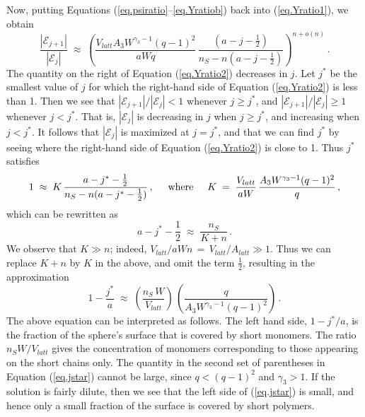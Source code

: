 \documentclass[journal=jacsat,manuscript=article]{achemso}
\begin{document}
Now, putting Equations (\ref{eq.psiratio}--\ref{eq.Yratiob}) back into (\ref{eq.Yratio1}), we obtain
\begin{equation}
    \label{eq.Yratio2}
       \frac{|\mathcal{E}_{j+1}|}{|\mathcal{E}_j|} \; \approx \; 
       \left(  \frac{ V_{latt}A_3W^{\gamma_3-1}(q-1)^2}{aWq} \,
          \frac{(a-j-\frac{1}{2})}{n_S-n(a-j-\frac{1}{2})} \right)^{n+o(n)}   \,.
\end{equation}
The quantity on the right of Equation (\ref{eq.Yratio2}) decreases in $j$.  Let $j^*$ be the 
smallest value of $j$ for which the right-hand side of Equation (\ref{eq.Yratio2}) is less than 1.
Then we see that $|\mathcal{E}_{j+1}|/|\mathcal{E}_j|<1$ whenever $j\geq j^*$, and 
$|\mathcal{E}_{j+1}|/|\mathcal{E}_j|\geq 1$ whenever $j< j^*$.
That is, $|\mathcal{E}_j|$ is decreasing in $j$ when $j\geq j^*$, and 
increasing when $j< j^*$.
It follows that $|\mathcal{E}_j|$ is maximized at $j=j^*$, and that we can find $j^*$ by seeing 
where the right-hand side of Equation (\ref{eq.Yratio2}) is close to 1.   Thus $j^*$ satisfies
\[     1  \;\approx \; 
     K  \,%
          \frac{a-j^*-\frac{1}{2}}{n_S-n(a-j^*-\frac{1}{2})}    \,,  
             \hspace{5mm}\hbox{where}\hspace{5mm}
             K \;=\;   \frac{ V_{latt} }{aW}\, \frac{   A_3W^{\gamma_3-1}(q-1)^2}{q} \,,
\]
which can be rewritten as 
\[       a-j^*-\frac{1}{2} \; \approx\;    \frac{n_S}{K+n}   \,.
\]
We observe that $K\gg n$; indeed,  $V_{latt}/aWn \,=\,V_{latt}/A_{latt}\gg 1$.  
Thus we can replace $K+n$ by $K$ in the above, and omit the term $\frac{1}{2}$, resulting in the   
approximation 
\begin{equation}
    \label{eq.jstar}
     1-\frac{j^*}{a}     \; \approx   \; 
        \left(  \frac{n_S\,W}{V_{latt} }\right) \,\left(   \frac{q}{A_3W^{\gamma_3-1}(q-1)^2}\right)  \,.
\end{equation}
The above equation can be interpreted as follows.  The left hand side, $1-j^*/a$, is the fraction of the
sphere's surface that is covered by short monomers.  The ratio $n_SW/V_{latt}$ gives
the concentration of monomers corresponding to those appearing on the short chains only.
The quantity in the second set of 
parentheses in Equation (\ref{eq.jstar}) cannot be large, since $q<(q-1)^2$ and $\gamma_3>1$.
If the solution is fairly dilute, then we see that the left side of (\ref{eq.jstar}) is small,
and hence only a small fraction of the surface is covered by short polymers.
\end{document}
